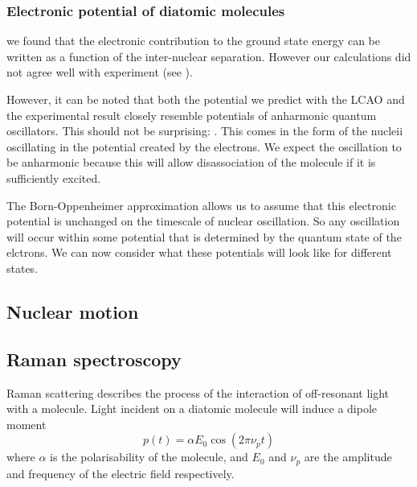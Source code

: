 \subsubsection{Electronic potential of diatomic molecules}

 we found that the electronic contribution to the ground state energy
can be written as a function of the inter-nuclear separation. However our
calculations did not agree well with experiment (see
).

However, it can be noted that both the potential we predict with the LCAO and
the experimental result closely resemble potentials of anharmonic quantum
oscillators. This should not be surprising: . This comes in the form of the
nucleii oscillating in the potential created by the electrons.  We expect the oscillation to be anharmonic
because this will allow disassociation of the molecule if it is sufficiently
excited.

The Born-Oppenheimer approximation allows us to assume that this electronic
potential is unchanged on the timescale of nuclear oscillation. So any
oscillation will occur within some potential that is determined by the quantum
state of the elctrons. We can now consider what these potentials will look like
for different states.

%

\subsection{Nuclear motion}

\subsection{Raman spectroscopy}

Raman scattering describes the process of the interaction of off-resonant light
with a molecule.  Light incident on a diatomic molecule will induce a dipole
moment
%
\begin{equation}
  p(t) = \alpha E_0 \cos(2\pi\nu_p t)
\end{equation}
%
where $\alpha$ is the polarisability of the molecule, and $E_0$ and $\nu_p$ are
the amplitude and frequency of the electric field respectively.

